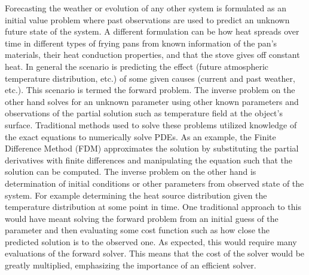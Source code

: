 Forecasting the weather or evolution of any other system is formulated as an initial value problem where past observations are used to predict an unknown future state of the system. A different formulation can be how heat spreads over time in different types of frying pans from known information of the pan's materials, their heat conduction properties, and that the stove gives off constant heat. In general the scenario is predicting the effect (future atmospheric temperature distribution, etc.) of some given causes (current and past weather, etc.). This scenario is termed the forward problem. The inverse problem on the other hand solves for an unknown parameter using other known parameters and observations of the partial solution such as temperature field at the object's surface. Traditional methods used to solve these problems utilized knowledge of the exact equations to numerically solve PDEs. As an example, the Finite Difference Method (FDM) approximates the solution by substituting the partial derivatives with finite differences and manipulating the equation such that the solution can be computed. The inverse problem on the other hand is determination of initial conditions or other parameters from observed state of the system. For example determining the heat source distribution given the temperature distribution at some point in time. One traditional approach to this would have meant solving the forward problem from an initial guess of the parameter and then evaluating some cost function such as how close the predicted solution is to the observed one. As expected, this would require many evaluations of the forward solver. This means that the cost of the solver would be greatly multiplied, emphasizing the importance of an efficient solver.

